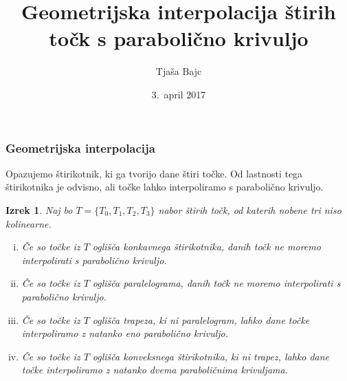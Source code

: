 \documentclass{beamer}
\title{Geometrijska interpolacija štirih točk s parabolično krivuljo}
\author{Tjaša Bajc}
\institute{mentorica \\ izr.~prof.~dr.~Marjetka Knez}
\date{3.\ april 2017}
\newtheorem{izrek}{Izrek}
\begin{document}

\begin{frame}
\titlepage
\end{frame}


%
%
%
%
%
%
%



\begin{frame}
\frametitle{Geometrijska interpolacija}

Opazujemo štirikotnik, ki ga tvorijo dane štiri točke. Od lastnosti tega štirikotnika je odvisno, ali točke lahko interpoliramo s parabolično krivuljo.

\begin{izrek}
Naj bo $T = \{ T_0, T_1, T_2, T_3 \}$ nabor štirih točk, od katerih nobene tri niso kolinearne.

\begin{enumerate}[i)]
\item Če so točke iz $T$ oglišča konkavnega štirikotnika, danih točk ne moremo interpolirati s parabolično krivuljo.
\item Če so točke iz $T$ oglišča paralelograma, danih točk ne moremo interpolirati s parabolično krivuljo.
\item Če so točke iz $T$ oglišča trapeza, ki ni paralelogram, lahko dane točke interpoliramo z natanko eno parabolično krivuljo.
\item Če so točke iz $T$ oglišča konveksnega štirikotnika, ki ni trapez, lahko dane točke interpoliramo z natanko dvema paraboličnima krivuljama.
\end{enumerate}

\end{izrek}

\end{frame}
\end{document}

